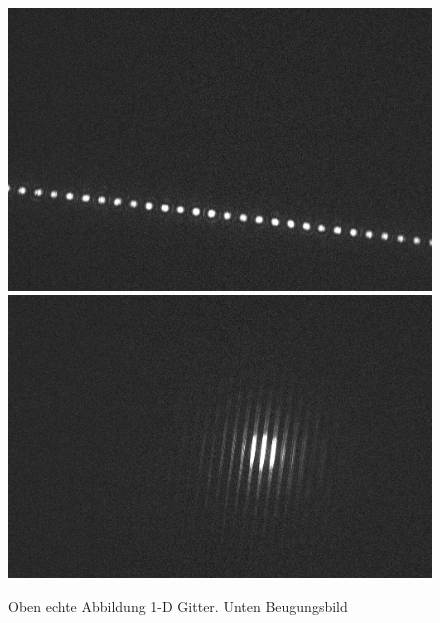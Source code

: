\begin{figure}[h]
	\centering
	\includegraphics[width=\textwidth]{Daten/gitter_1.jpg}
	\includegraphics[width=\textwidth]{Daten/gitter_2.jpg}
	\caption[Aufnahme Punktgitter]{Oben echte Abbildung 1-D Gitter. Unten Beugungsbild}
\end{figure}

